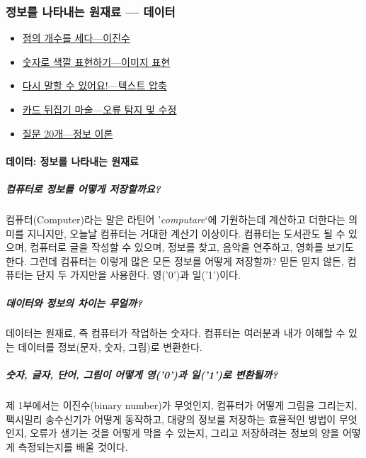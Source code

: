 \documentclass[]{article}
\begin{document}
\subsubsection{정보를 나타내는 원재료 --- 데이터}\label{mdash-}

\begin{itemize}
\itemsep1pt\parskip0pt
\item
  \href{csunplugged/01-part/01-binary-numbers.html}{점의 개수를
  세다---이진수}
\item
  \href{csunplugged/01-part/02-image-representation.html}{숫자로 색깔
  표현하기---이미지 표현}
\item
  \href{csunplugged/01-part/03-text-compression.html}{다시 말할 수
  있어요!---텍스트 압축}
\item
  \href{csunplugged/01-part/04-checksum.html}{카드 뒤집기 마술---오류
  탐지 및 수정}
\item
  \href{csunplugged/01-part/05-info-theory.html}{질문 20개---정보 이론}
\end{itemize}

\mbox{}\paragraph{데이터: 정보를 나타내는 원재료}\label{section-1}

\subparagraph{컴퓨터로 정보를 어떻게 저장할까요?}\label{section-2}

컴퓨터(Computer)라는 말은 라틴어 '\emph{computare}`에 기원하는데
계산하고 더한다는 의미를 지니지만, 오늘날 컴퓨터는 거대한 계산기
이상이다. 컴퓨터는 도서관도 될 수 있으며, 컴퓨터로 글을 작성할 수
있으며, 정보를 찾고, 음악을 연주하고, 영화를 보기도 한다. 그런데
컴퓨터는 이렇게 많은 모든 정보를 어떻게 저장할까? 믿든 믿지 않든,
컴퓨터는 단지 두 가지만을 사용한다. 영('0')과 일('1')이다.

\subparagraph{데이터와 정보의 차이는 무얼까?}\label{section-3}

데이터는 원재료, 즉 컴퓨터가 작업하는 숫자다. 컴퓨터는 여러분과 내가
이해할 수 있는 데이터를 정보(문자, 숫자, 그림)로 변환한다.

\subparagraph{숫자, 글자, 단어, 그림이 어떻게 영('0')과 일('1')로
변환될까?}\label{section-4}

제 1부에서는 이진수(binary number)가 무엇인지, 컴퓨터가 어떻게 그림을
그리는지, 팩시밀리 송수신기가 어떻게 동작하고, 대량의 정보를 저장하는
효율적인 방법이 무엇인지, 오류가 생기는 것을 어떻게 막을 수 있는지,
그리고 저장하려는 정보의 양을 어떻게 측정되는지를 배울 것이다.
\end{document}
